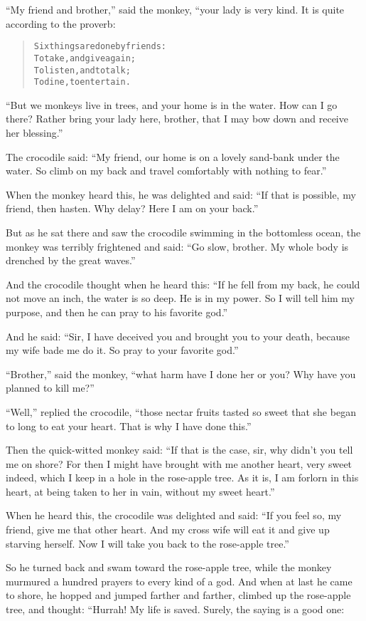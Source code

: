 \documentclass[article, twoside, 10pt]{memoir}
\renewenvironment{verbatim}{%
\begin{quote}%
\vskip -10pt%
\begin{alltt}\normalfont\small}{\end{alltt}%
\end{quote}%
\vskip -10pt
} %
\begin{document}
``My friend and brother,'' said the monkey, “your lady is very
kind. It is quite according to the proverb:

\begin{verbatim}
Six things are done by friends:
To take, and give again;
To listen, and to talk;
To dine, to entertain.
\end{verbatim}
``But we monkeys live in trees, and your home is in the water. How can I go there? Rather bring your lady here, brother, that I may bow down and receive her blessing.''

The crocodile said:
``My friend, our home is on a lovely sand-bank under the water. So climb on my back and travel comfortably with nothing to fear.''

When the monkey heard this, he was delighted and said:
``If that is possible, my friend, then hasten. Why delay? Here I am on your back.''

But as he sat there and saw the crocodile swimming in the
bottomless ocean, the monkey was terribly frightened and said:
``Go slow, brother. My whole body is drenched by the great waves.''

And the crocodile thought when he heard this:
``If he fell from my back, he could not move an inch, the water is so deep. He is in my power. So I will tell him my purpose, and then he can pray to his favorite god.''

And he said:
``Sir, I have deceived you and brought you to your death, because my wife bade me do it. So pray to your favorite god.''

``Brother,'' said the monkey,
``what harm have I done her or you? Why have you planned to kill me?''

``Well,'' replied the crocodile,
``those nectar fruits tasted so sweet that she began to long to eat your heart. That is why I have done this.''

Then the quick-witted monkey said:
``If that is the case, sir, why didn't you tell me on shore? For then I might have brought with me another heart, very sweet indeed, which I keep in a hole in the rose-apple tree. As it is, I am forlorn in this heart, at being taken to her in vain, without my sweet heart.''

When he heard this, the crocodile was delighted and said:
``If you feel so, my friend, give me that other heart. And my cross wife will eat it and give up starving herself. Now I will take you back to the rose-apple tree.''

So he turned back and swam toward the rose-apple tree, while the
monkey murmured a hundred prayers to every kind of a god. And when
at last he came to shore, he hopped and jumped farther and farther,
climbed up the rose-apple tree, and thought: “Hurrah! My life is
saved. Surely, the saying is a good one:
\end{document}
